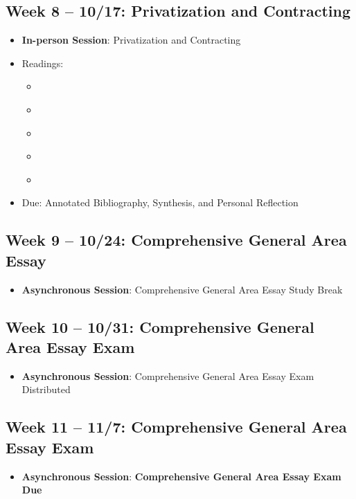 \documentclass[12pt, letterpaper]{article}
\begin{document}
\subsection*{Week 8 -- 10/17: Privatization and Contracting}
\begin{itemize}
    \item \textbf{In-person Session}: Privatization and Contracting
    \item Readings:
    \begin{itemize}
        \item \cite{brown2016} %
         \item \cite{Cohen2008} %
         \item \cite{Hefetz2014} %
         \item \cite{jos2009} %
         \item \cite{lamothe2012} %
    \end{itemize}   
    \item Due: Annotated Bibliography, Synthesis, and Personal Reflection
\end{itemize}

\subsection*{Week 9 -- 10/24: Comprehensive General Area Essay}
\begin{itemize}
    \item \textbf{Asynchronous Session}: Comprehensive General Area Essay Study Break
\end{itemize}


\subsection*{Week 10 -- 10/31: Comprehensive General Area Essay Exam}
\begin{itemize}
    \item \textbf{Asynchronous Session}: Comprehensive General Area Essay Exam Distributed
\end{itemize}   

\subsection*{Week 11 -- 11/7: Comprehensive General Area Essay Exam}
\begin{itemize}
    \item \textbf{Asynchronous Session}: \textbf{Comprehensive General Area Essay Exam Due}
\end{itemize}
\end{document}
